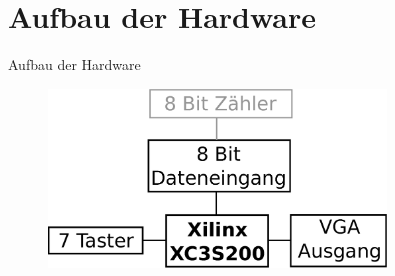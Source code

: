 \section{Aufbau der Hardware}
\begin{frame}[<+->]{Aufbau der Hardware}
    \begin{figure}
        \centerline{
            \includegraphics[width=0.8\textwidth]{abbildungen/hardware}
        }
    \end{figure}
\end{frame}
